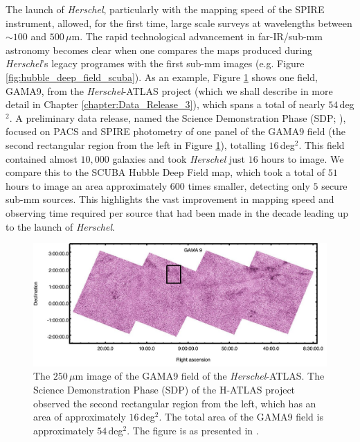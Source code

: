 The launch of \textit{Herschel}, particularly with the mapping speed of the SPIRE instrument, allowed, for the first time, large scale surveys at wavelengths between $\sim 100$ and $500\,\mu$m. The rapid technological advancement in far-IR/sub-mm astronomy becomes clear when one compares the maps produced during \textit{Herschel}'s legacy programes with the first sub-mm images (e.g. Figure \ref{fig:hubble_deep_field_scuba}). As an example, Figure \ref{fig:gama9} shows one field, GAMA9, from the \textit{Herschel}-ATLAS project (which we shall describe in more detail in Chapter \ref{chapter:Data_Release_3}), which spans a total of nearly $54\,$deg$^2$. A preliminary data release, named the Science Demonstration Phase (SDP; \citealt{Ibar_2010, Rigby_2011, Pascale_2011}), focused on PACS and SPIRE photometry of one panel of the GAMA9 field (the second rectangular region from the left in Figure \ref{fig:gama9}), totalling $16\,$deg$^2$. This field contained almost $10,000$ galaxies and took \textit{Herschel} just $16$ hours to image. We compare this to the SCUBA Hubble Deep Field map, which took a total of $51$ hours to image an area approximately $600$ times smaller, detecting only $5$ secure sub-mm sources. This highlights the vast improvement in mapping speed and observing time required per source that had been made in the decade leading up to the launch of \textit{Herschel}.

\begin{figure}
    \centering
	\includegraphics[width=0.9\columnwidth]{Figures/GAMA9.pdf}
	\caption[$250\,\mu$m map of the GAMA9 field of H-ATLAS]{The $250\,\mu$m image of the GAMA9 field of the \textit{Herschel}-ATLAS. The Science Demonstration Phase (SDP) of the H-ATLAS project observed the second rectangular region from the left, which has an area of approximately $16\,$deg$^2$. The total area of the GAMA9 field is approximately $54\,$deg$^2$. The figure is as presented in \citealt{Valiante_2016}.}
	\label{fig:gama9}
\end{figure}

